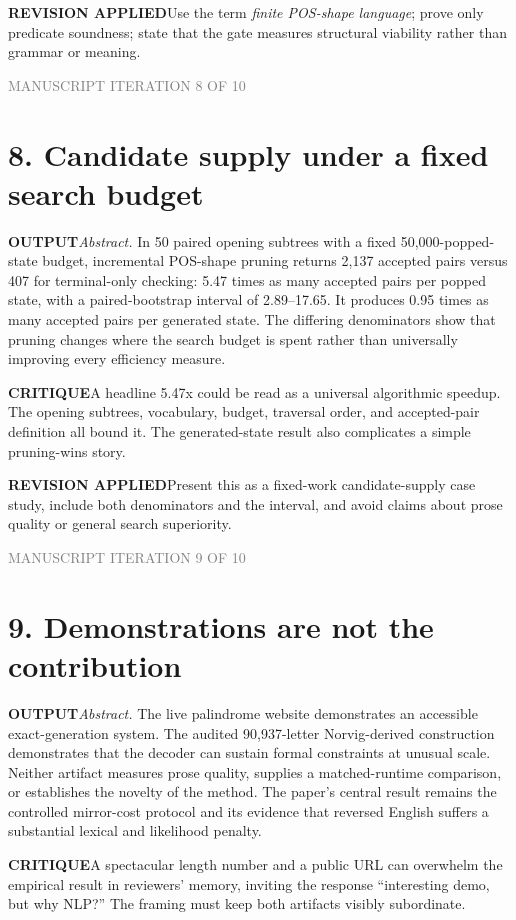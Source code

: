 \documentclass[10pt]{article}
\newcommand{\outputlabel}{\textcolor{teal!65!black}{\textbf{OUTPUT}}}
\newcommand{\critiquelabel}{\textcolor{red!65!black}{\textbf{CRITIQUE}}}
\newcommand{\reviselabel}{\textcolor{blue!65!black}{\textbf{REVISION APPLIED}}}
\newcommand{\pass}[1]{\textcolor{gray}{\small MANUSCRIPT ITERATION #1 OF 10}}
\begin{document}
\reviselabel\quad Use the term \emph{finite POS-shape language}; prove only predicate soundness; state that the gate measures structural viability rather than grammar or meaning.

\newpage
\pass{8}
\section*{8. Candidate supply under a fixed search budget}
\outputlabel\quad \emph{Abstract.} In 50 paired opening subtrees with a fixed 50,000-popped-state budget, incremental POS-shape pruning returns 2,137 accepted pairs versus 407 for terminal-only checking: 5.47 times as many accepted pairs per popped state, with a paired-bootstrap interval of 2.89--17.65. It produces 0.95 times as many accepted pairs per generated state. The differing denominators show that pruning changes where the search budget is spent rather than universally improving every efficiency measure.

\critiquelabel\quad A headline 5.47x could be read as a universal algorithmic speedup. The opening subtrees, vocabulary, budget, traversal order, and accepted-pair definition all bound it. The generated-state result also complicates a simple pruning-wins story.

\reviselabel\quad Present this as a fixed-work candidate-supply case study, include both denominators and the interval, and avoid claims about prose quality or general search superiority.

\newpage
\pass{9}
\section*{9. Demonstrations are not the contribution}
\outputlabel\quad \emph{Abstract.} The live palindrome website demonstrates an accessible exact-generation system. The audited 90,937-letter Norvig-derived construction demonstrates that the decoder can sustain formal constraints at unusual scale. Neither artifact measures prose quality, supplies a matched-runtime comparison, or establishes the novelty of the method. The paper's central result remains the controlled mirror-cost protocol and its evidence that reversed English suffers a substantial lexical and likelihood penalty.

\critiquelabel\quad A spectacular length number and a public URL can overwhelm the empirical result in reviewers' memory, inviting the response ``interesting demo, but why NLP?'' The framing must keep both artifacts visibly subordinate.
\end{document}
